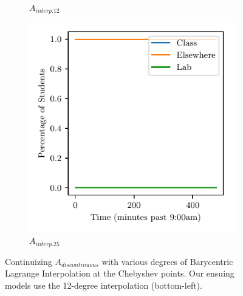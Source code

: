 \documentclass[11pt]{amsart}
\begin{document}
\begin{figure}[htp]
\begin{subfigure}[b]{0.32\textwidth}
        \caption{$A_{interp.12}$}
        \label{fig:interp_degrees_12}
    \end{subfigure}
    \hfill
    \begin{subfigure}[b]{0.32\textwidth}
        \includegraphics[width=\textwidth]{temp.pdf}
        \caption{$A_{interp.25}$}
        \label{fig:interp_degrees_25}
    \end{subfigure}
    \caption{Continuizing $A_{discontinuous}$ with various degrees of Barycentric Lagrange Interpolation 
    at the Chebyshev points. Our ensuing models use the 12-degree interpolation (bottom-left).}
    \label{fig:interp_degrees}
\end{figure}
\end{document}
